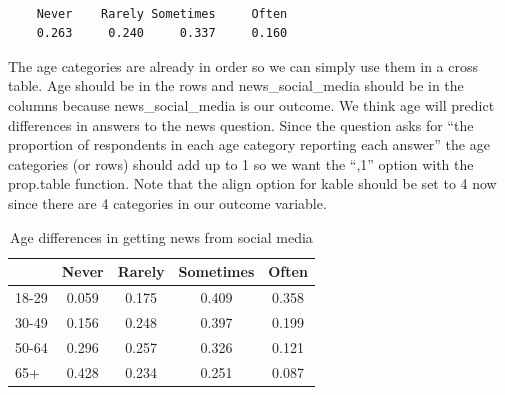 \documentclass[
  letterpaper,
  DIV=11,
  numbers=noendperiod]{scrartcl}
\newenvironment{Shaded}{\begin{snugshade}}{\end{snugshade}}
\newcommand{\AttributeTok}[1]{\textcolor[rgb]{0.40,0.45,0.13}{#1}}
\newcommand{\ConstantTok}[1]{\textcolor[rgb]{0.56,0.35,0.01}{#1}}
\newcommand{\DecValTok}[1]{\textcolor[rgb]{0.68,0.00,0.00}{#1}}
\newcommand{\FunctionTok}[1]{\textcolor[rgb]{0.28,0.35,0.67}{#1}}
\newcommand{\NormalTok}[1]{\textcolor[rgb]{0.00,0.23,0.31}{#1}}
\newcommand{\SpecialCharTok}[1]{\textcolor[rgb]{0.37,0.37,0.37}{#1}}
\newcommand{\StringTok}[1]{\textcolor[rgb]{0.13,0.47,0.30}{#1}}
\begin{document}
\begin{verbatim}

    Never    Rarely Sometimes     Often 
    0.263     0.240     0.337     0.160 
\end{verbatim}

The age categories are already in order so we can simply use them in a
cross table. Age should be in the rows and news\_social\_media should be
in the columns because news\_social\_media is our outcome. We think age
will predict differences in answers to the news question. Since the
question asks for ``the proportion of respondents in each age category
reporting each answer'' the age categories (or rows) should add up to 1
so we want the ``,1'' option with the prop.table function. Note that the
align option for kable should be set to 4 now since there are 4
categories in our outcome variable.

\begin{Shaded}
\end{Shaded}

\begin{table}[!h]

\caption{Age differences in getting news from social media}
\centering
\begin{tabular}[t]{lcccc}
\toprule
  & Never & Rarely & Sometimes & Often\\
\midrule
18-29 & 0.059 & 0.175 & 0.409 & 0.358\\
30-49 & 0.156 & 0.248 & 0.397 & 0.199\\
50-64 & 0.296 & 0.257 & 0.326 & 0.121\\
65+ & 0.428 & 0.234 & 0.251 & 0.087\\
\bottomrule
\end{tabular}
\end{table}
\end{document}
